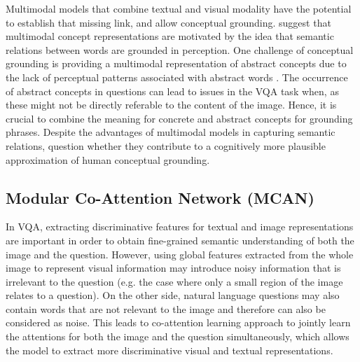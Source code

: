 \documentclass{article}
\begin{document}
Multimodal models that combine textual and visual modality have the potential to establish that missing link, and allow conceptual grounding. \cite{beinborn2018multimodal} suggest that multimodal concept representations are motivated by the idea that semantic relations between words are grounded in perception. One challenge of conceptual grounding is providing a multimodal representation of abstract concepts due to the lack of perceptual patterns associated with abstract words \cite{hill2014multi}. The occurrence of abstract concepts in questions can lead to issues in the VQA task when, as these might not be directly referable to the content of the image. Hence, it is crucial to combine the meaning for concrete and abstract concepts for grounding phrases. Despite the advantages of multimodal models in capturing semantic relations, \cite{beinborn2018multimodal} question whether they contribute to a cognitively more plausible approximation of human conceptual grounding.

\subsection{Modular Co-Attention Network (MCAN)} \label{mcan}
In VQA, extracting discriminative features for textual and image representations are important in order to obtain fine-grained semantic understanding of both the image and the question. However, using global features extracted from the whole image to represent visual information may introduce noisy information that is irrelevant to the question (e.g. the case where only a small region of the image relates to a question). On the other side, natural language questions may also contain words that are not relevant to the image and therefore can also be considered as noise. 
This leads to co-attention learning approach to jointly learn the attentions for both the image and the question simultaneously, which allows the model to extract more discriminative visual and textual representations. 
\end{document}
